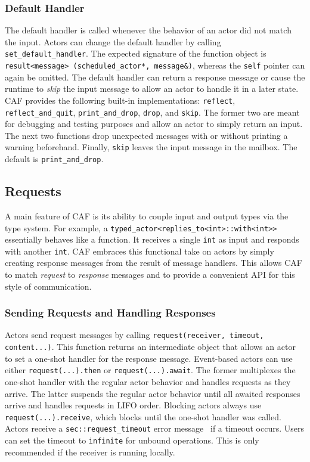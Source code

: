\subsubsection{Default Handler}
\label{default-handler}

The default handler is called whenever the behavior of an actor did not match
the input. Actors can change the default handler by calling
\lstinline^set_default_handler^. The expected signature of the function object
is \lstinline^result<message> (scheduled_actor*, message&)^, whereas the
\lstinline^self^ pointer can again be omitted. The default handler can return a
response message or cause the runtime to \emph{skip} the input message to allow
an actor to handle it in a later state. CAF provides the following built-in
implementations: \lstinline^reflect^, \lstinline^reflect_and_quit^,
\lstinline^print_and_drop^, \lstinline^drop^, and \lstinline^skip^. The former
two are meant for debugging and testing purposes and allow an actor to simply
return an input. The next two functions drop unexpected messages with or
without printing a warning beforehand. Finally, \lstinline^skip^ leaves the
input message in the mailbox. The default is \lstinline^print_and_drop^.

\subsection{Requests}
\label{request}

A main feature of CAF is its ability to couple input and output types via the
type system. For example, a \lstinline^typed_actor<replies_to<int>::with<int>>^
essentially behaves like a function. It receives a single \lstinline^int^ as
input and responds with another \lstinline^int^. CAF embraces this functional
take on actors by simply creating response messages from the result of message
handlers. This allows CAF to match \emph{request} to \emph{response} messages
and to provide a convenient API for this style of communication.

\subsubsection{Sending Requests and Handling Responses}
\label{handling-response}

Actors send request messages by calling \lstinline^request(receiver, timeout, content...)^. This function returns an intermediate object that allows an actor to set a one-shot handler for the response message. Event-based actors can use either \lstinline^request(...).then^ or \lstinline^request(...).await^. The former multiplexes the one-shot handler with the regular actor behavior and handles requests as they arrive. The latter suspends the regular actor behavior until all awaited responses arrive and handles requests in LIFO order. Blocking actors always use \lstinline^request(...).receive^, which blocks until the one-shot handler was called. Actors receive a \lstinline^sec::request_timeout^  error message~ if a timeout occurs. Users can set the timeout to \lstinline^infinite^ for unbound operations. This is only recommended if the receiver is running locally.

